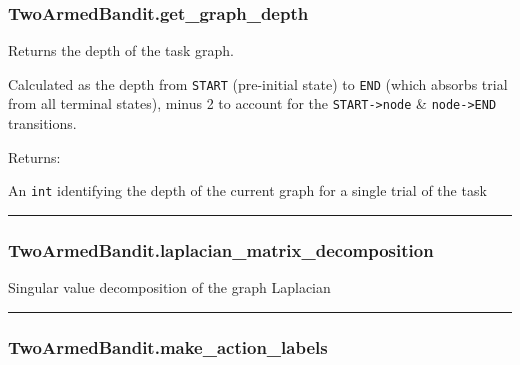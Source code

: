 \subsubsection{TwoArmedBandit.get\_graph\_depth}\label{twoarmedbandit.get_graph_depth}

\begin{Shaded}
\begin{Highlighting}[]
\NormalTok{)}
\end{Highlighting}
\end{Shaded}

Returns the depth of the task graph.

Calculated as the depth from \texttt{START} (pre-initial state) to
\texttt{END} (which absorbs trial from all terminal states), minus 2 to
account for the \texttt{START-\textgreater{}node} \&
\texttt{node-\textgreater{}END} transitions.

Returns:

An \texttt{int} identifying the depth of the current graph for a single
trial of the task

\begin{center}\rule{0.5\linewidth}{\linethickness}\end{center}

\subsubsection{TwoArmedBandit.laplacian\_matrix\_decomposition}\label{twoarmedbandit.laplacian_matrix_decomposition}

\begin{Shaded}
\begin{Highlighting}[]
\NormalTok{)}
\end{Highlighting}
\end{Shaded}

Singular value decomposition of the graph Laplacian

\begin{center}\rule{0.5\linewidth}{\linethickness}\end{center}

\subsubsection{TwoArmedBandit.make\_action\_labels}\label{twoarmedbandit.make_action_labels}

